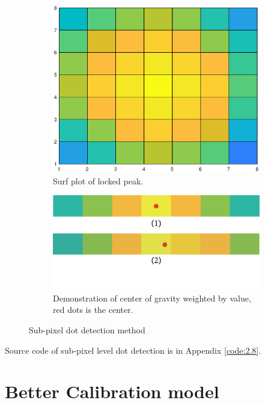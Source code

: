\begin{figure}[h!]
	\centering
	\begin{subfigure}[t]{0.48\linewidth}
		\includegraphics[width=1\linewidth]{figures/part2/sub_pixel}
		\caption{Surf plot of locked peak.}
		\label{fig:sub_pixel}
	\end{subfigure}
	\begin{subfigure}[t]{0.48\linewidth}
		\centering
		\includegraphics[width=1\linewidth]{figures/part2/weight1}
		\caption{Demonstration of center of gravity weighted by value, red dots is the center.}
		\label{fig:weight}
	\end{subfigure}
	\caption{Sub-pixel dot detection method}
\end{figure}

Source code of sub-pixel level dot detection is in Appendix \ref{code:2.8}. 

\section{Better Calibration model}

